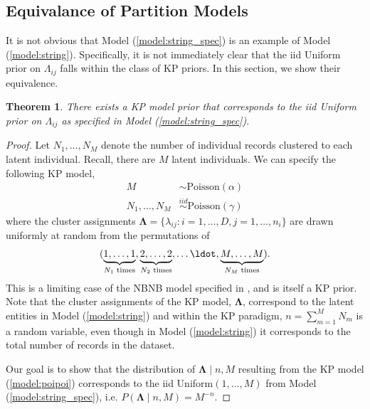 \documentclass[11pt]{article}\usepackage[]{graphicx}\usepackage[]{color}
\newtheorem{theorem}{Theorem}
\begin{document}
\subsection{Equivalance of Partition Models}
It is not obvious that Model (\ref{model:string_spec}) is an example of Model (\ref{model:string}). Specifically, it is not immediately clear that the iid Uniform prior on $\Lambda_{ij}$ falls within the class of KP priors. In this section, we show their equivalence.

\begin{theorem}
\label{thm:equiv}
There exists a KP model prior that corresponds to the iid Uniform prior on $\Lambda_{ij}$ as specified in Model (\ref{model:string_spec}).
\end{theorem}

\begin{proof}
Let $N_1, \dots, N_M$ denote the number of individual records clustered to each latent individual. Recall, there are $M$ latent individuals. We can specify the following KP model,
\begin{align}
M &\sim \text{Poisson}(\alpha)\\
N_1, \dots, N_M &\stackrel{iid}{\sim} \text{Poisson}(\gamma) \label{model:poipoi}
\end{align}
where the cluster assignments $\boldsymbol \Lambda = \{\lambda_{ij}: i = 1, \dots, D, j = 1, \dots, n_i\}$ are drawn uniformly at random from the permutations of
\begin{align}
(\underbrace{1,\ldots,1}_\text{$N_1$ times},\underbrace{2,\ldots,2}_\text{$N_2$ times},\ldots\ldot , \underbrace{M,\ldots,M}_\text{$N_M$ times}).
\label{eqn:vector}
\end{align}
This is a limiting case of the NBNB model specified in \cite{zanella2016microclustering}, and is itself a KP prior. Note that the cluster assignments of the KP model, $\boldsymbol \Lambda$, correspond to the latent entities in Model (\ref{model:string}) and within the KP paradigm, $n = \sum_{m=1}^M N_m$ is a random variable, even though in Model (\ref{model:string}) it corresponds to the total number of records in the dataset.

Our goal is to show that the distribution of $\boldsymbol \Lambda \mid n, M$ resulting from the KP model (\ref{model:poipoi}) corresponds to the iid Uniform$(1, \dots, M)$ from Model (\ref{model:string_spec}), i.e. $P(\boldsymbol \Lambda \mid n, M) = M^{-n}$.


\end{proof}
\end{document}
